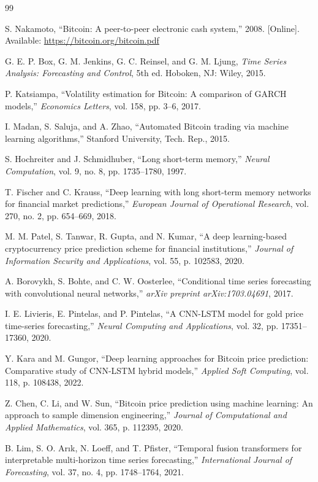 \documentclass[12pt]{article}
\begin{document}
\newpage
\begin{thebibliography}{99}

S. Nakamoto, ``Bitcoin: A peer-to-peer electronic cash system,'' 2008. [Online]. Available: \url{https://bitcoin.org/bitcoin.pdf}

G. E. P. Box, G. M. Jenkins, G. C. Reinsel, and G. M. Ljung, \textit{Time Series Analysis: Forecasting and Control}, 5th ed. Hoboken, NJ: Wiley, 2015.

P. Katsiampa, ``Volatility estimation for Bitcoin: A comparison of GARCH models,'' \textit{Economics Letters}, vol. 158, pp. 3--6, 2017.

I. Madan, S. Saluja, and A. Zhao, ``Automated Bitcoin trading via machine learning algorithms,'' Stanford University, Tech. Rep., 2015.

S. Hochreiter and J. Schmidhuber, ``Long short-term memory,'' \textit{Neural Computation}, vol. 9, no. 8, pp. 1735--1780, 1997.

T. Fischer and C. Krauss, ``Deep learning with long short-term memory networks for financial market predictions,'' \textit{European Journal of Operational Research}, vol. 270, no. 2, pp. 654--669, 2018.

M. M. Patel, S. Tanwar, R. Gupta, and N. Kumar, ``A deep learning-based cryptocurrency price prediction scheme for financial institutions,'' \textit{Journal of Information Security and Applications}, vol. 55, p. 102583, 2020.

A. Borovykh, S. Bohte, and C. W. Oosterlee, ``Conditional time series forecasting with convolutional neural networks,'' \textit{arXiv preprint arXiv:1703.04691}, 2017.

I. E. Livieris, E. Pintelas, and P. Pintelas, ``A CNN-LSTM model for gold price time-series forecasting,'' \textit{Neural Computing and Applications}, vol. 32, pp. 17351--17360, 2020.

Y. Kara and M. Gungor, ``Deep learning approaches for Bitcoin price prediction: Comparative study of CNN-LSTM hybrid models,'' \textit{Applied Soft Computing}, vol. 118, p. 108438, 2022.

Z. Chen, C. Li, and W. Sun, ``Bitcoin price prediction using machine learning: An approach to sample dimension engineering,'' \textit{Journal of Computational and Applied Mathematics}, vol. 365, p. 112395, 2020.

B. Lim, S. O. Arık, N. Loeff, and T. Pfister, ``Temporal fusion transformers for interpretable multi-horizon time series forecasting,'' \textit{International Journal of Forecasting}, vol. 37, no. 4, pp. 1748--1764, 2021.

\end{thebibliography}
\end{document}
